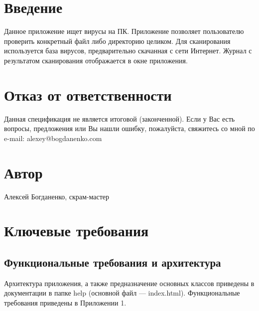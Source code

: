 \section{Введение}
Данное приложение ищет вирусы на ПК. Приложение позволяет пользователю проверить
конкретный файл либо директорию целиком. Для сканирования используется база
вирусов, предварительно скачанная с сети Интернет. Журнал с результатом
сканирования отображается в окне приложения.
\section{Отказ от ответственности}
Данная спецификация не является итоговой (законченной). Если у Вас есть вопросы,
предложения или Вы нашли ошибку, пожалуйста, свяжитесь со мной по e-mail:
alexey@bogdanenko.com
\section{Автор}
Алексей Богданенко, скрам-мастер
\section{Ключевые требования}
\subsection{Функциональные требования и архитектура}
Архитектура приложения, а также предназначение основных классов приведены в
документации в папке help (основной файл — index.html). Функциональные
требования приведены в Приложении 1.

